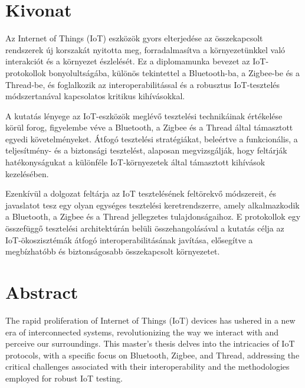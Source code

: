 \setcounter{page}{1}

\selecthungarian

\chapter*{Kivonat}

Az Internet of Things (IoT) eszközök gyors elterjedése az összekapcsolt rendszerek új korszakát nyitotta meg, forradalmasítva a környezetünkkel való interakciót és a környezet észlelését. Ez a diplomamunka bevezet az IoT-protokollok bonyolultságába, különös tekintettel a Bluetooth-ba, a Zigbee-be és a Thread-be, és foglalkozik az interoperabilitással és a robusztus IoT-tesztelés módszertanával kapcsolatos kritikus kihívásokkal.

A kutatás lényege az IoT-eszközök meglévő tesztelési technikáinak értékelése körül forog, figyelembe véve a Bluetooth, a Zigbee és a Thread által támasztott egyedi követelményeket. Átfogó tesztelési stratégiákat, beleértve a funkcionális, a teljesítmény- és a biztonsági tesztelést, alaposan megvizsgálják, hogy feltárják hatékonyságukat a különféle IoT-környezetek által támasztott kihívások kezelésében.

Ezenkívül a dolgozat feltárja az IoT tesztelésének feltörekvő módszereit, és javaslatot tesz egy olyan egységes tesztelési keretrendszerre, amely alkalmazkodik a Bluetooth, a Zigbee és a Thread jellegzetes tulajdonságaihoz. E protokollok egy összefüggő tesztelési architektúrán belüli összehangolásával a kutatás célja az IoT-ökoszisztémák átfogó interoperabilitásának javítása, elősegítve a megbízhatóbb és biztonságosabb összekapcsolt környezetet.



\vfill
\selectenglish


\chapter*{Abstract}

The rapid proliferation of Internet of Things (IoT) devices has ushered in a new era of interconnected systems, revolutionizing the way we interact with and perceive our surroundings. This master's thesis delves into the intricacies of IoT protocols, with a specific focus on Bluetooth, Zigbee, and Thread, addressing the critical challenges associated with their interoperability and the methodologies employed for robust IoT testing.

